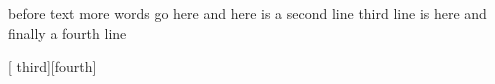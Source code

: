 before text more words go here
and here is a second line
third line is here
and finally a fourth line


[
	third][fourth]
